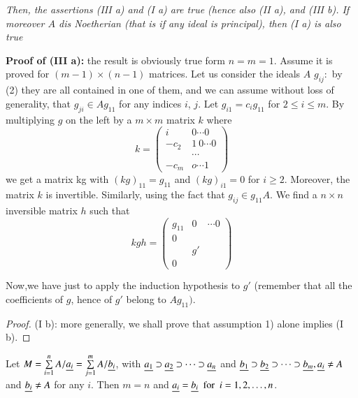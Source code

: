 \textit{Then, the assertions (III a) and (I a) are true (hence
  also (II a), and (III b). If moreover $A$ dis Noetherian (that
  is if any ideal is principal), then (I a) is also true} 

\textbf{Proof of (III a):}
the result is obviously true form $n=m=1$. Assume it is proved for
$(m-1)\times (n-1)$ matrices. Let us consider the ideals $A$ $g_{ij}:$ by (2)
they are all contained in one of them, and we can assume without loss
of generality, that $g_{ji}\in Ag_{11}$ for any indices $i$, $j$. Let
$g_{i1}=c_i g_{11}$ for $2 \leq i \leq m$. By multiplying $g$ on the
left by a $m \times m$ matrix $k$ where 
\begin{equation*}
k=
  \begin{pmatrix}
    i & 0 \cdots 0\\
    -c_2 & 1~ 0 \cdots 0\\
    & \cdots \\
    -c_m & o \cdots 1
  \end{pmatrix}
\end{equation*}
we get a matrix kg with $(kg)_{11}=g_{11}$  and  $(kg)_{i1}=0$  for
$i \geq 2$. Moreover, the matrix $k$ is invertible. Similarly, using
the fact that $g_{ij}\in g_{11} A$. We find a $n \times n$ inversible
matrix $h$ such that  
\begin{equation*} 
  kgh=
  \begin{pmatrix}
    g_{11} & 0 &\cdots 0\\
    0 & & \\
    & g'& \\
    0 & &
  \end{pmatrix}
\end{equation*}

Now,\pageoriginale we have just to apply the induction hypothesis to $g'$ (remember
that all the coefficients of $g$, hence of $g'$ belong to $A
g_{11})$. 
\begin{proof}
  (I b): more generally, we shall prove that assumption 1) alone
  implies (I b). 
\end{proof}

Let $M= \sum\limits^{n}_{i=1} A/ \underline{a_i} =\sum \limits^m_{j=1}
A/ \underline{b_i}$, with $\underline{a_1} \supset \underline{a_2}
\supset \cdots \supset \underline{a_n}$  and $\underline{b_1} \supset
\underline{b_2} \supset \cdots \supset \underline{b_m}, \underline{a_i} \neq A$ 
and $\underline{b_i} \neq A$  for any $i$. Then $m=n$ and
$\underline{a_i}=\underline{b_i} ~\text{ for }~ i = 1, 2, \ldots, n$.
 
